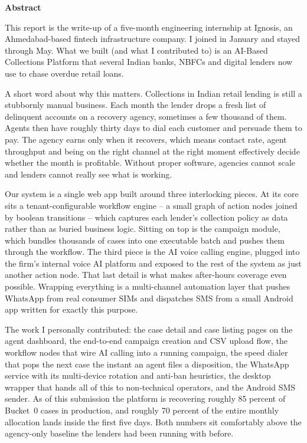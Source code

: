 \thispagestyle{plain}
\begin{center}
{\Large \bf Abstract}
\end{center}
\vspace{0.6cm}

\begin{justify}
This report is the write-up of a five-month engineering internship at Ignosis, an Ahmedabad-based fintech infrastructure company. I joined in January and stayed through May. What we built (and what I contributed to) is an AI-Based Collections Platform that several Indian banks, NBFCs and digital lenders now use to chase overdue retail loans.

A short word about why this matters. Collections in Indian retail lending is still a stubbornly manual business. Each month the lender drops a fresh list of delinquent accounts on a recovery agency, sometimes a few thousand of them. Agents then have roughly thirty days to dial each customer and persuade them to pay. The agency earns only when it recovers, which means contact rate, agent throughput and being on the right channel at the right moment effectively decide whether the month is profitable. Without proper software, agencies cannot scale and lenders cannot really see what is working.

Our system is a single web app built around three interlocking pieces. At its core sits a tenant-configurable workflow engine -- a small graph of action nodes joined by boolean transitions -- which captures each lender's collection policy as data rather than as buried business logic. Sitting on top is the campaign module, which bundles thousands of cases into one executable batch and pushes them through the workflow. The third piece is the AI voice calling engine, plugged into the firm's internal voice AI platform and exposed to the rest of the system as just another action node. That last detail is what makes after-hours coverage even possible. Wrapping everything is a multi-channel automation layer that pushes WhatsApp from real consumer SIMs and dispatches SMS from a small Android app written for exactly this purpose.

The work I personally contributed: the case detail and case listing pages on the agent dashboard, the end-to-end campaign creation and CSV upload flow, the workflow nodes that wire AI calling into a running campaign, the speed dialer that pops the next case the instant an agent files a disposition, the WhatsApp service with its multi-device rotation and anti-ban heuristics, the desktop wrapper that hands all of this to non-technical operators, and the Android SMS sender. As of this submission the platform is recovering roughly 85 percent of Bucket~0 cases in production, and roughly 70 percent of the entire monthly allocation lands inside the first five days. Both numbers sit comfortably above the agency-only baseline the lenders had been running with before.
\end{justify}

\clearpage
